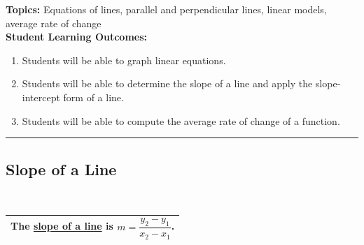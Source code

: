 

\noindent \textbf{Topics:}  Equations of lines, parallel and perpendicular lines, linear models, average rate of change\\

\noindent \textbf{Student Learning Outcomes:}
\begin{enumerate}
\item Students will be able to graph linear equations.
\item Students will be able to determine the slope of a line and apply the slope-intercept form of a line.
\item Students will be able to compute the average rate of change of a function.
\end{enumerate}

\hrule 

\bigskip

\subsection{Slope of a Line} ~

\noindent 
\begin{tabular}{| l |} \hline
The \underline{slope of a line} is $m = \dfrac{y_2-y_1}{x_2-x_1}$.  \\ \hline
 \end{tabular} 
 



